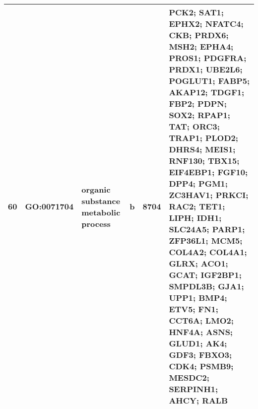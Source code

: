 \begin{table}[htp]
\begin{center}
\begin{tabular}{rlllrl}
  60 & GO:0071704 & organic substance metabolic process & b & 8704 & PCK2; SAT1; EPHX2; NFATC4; CKB; PRDX6; MSH2; EPHA4; PROS1; PDGFRA; PRDX1; UBE2L6; POGLUT1; FABP5; AKAP12; TDGF1; FBP2; PDPN; SOX2; RPAP1; TAT; ORC3; TRAP1; PLOD2; DHRS4; MEIS1; RNF130; TBX15; EIF4EBP1; FGF10; DPP4; PGM1; ZC3HAV1; PRKCI; RAC2; TET1; LIPH; IDH1; SLC24A5; PARP1; ZFP36L1; MCM5; COL4A2; COL4A1; GLRX; ACO1; GCAT; IGF2BP1; SMPDL3B; GJA1; UPP1; BMP4; ETV5; FN1; CCT6A; LMO2; HNF4A; ASNS; GLUD1; AK4; GDF3; FBXO3; CDK4; PSMB9; MESDC2; SERPINH1; AHCY; RALB \\ 
   \hline
\end{tabular} \label{tab:tab6}
  \end{center} 
  \end{table}

\clearpage






